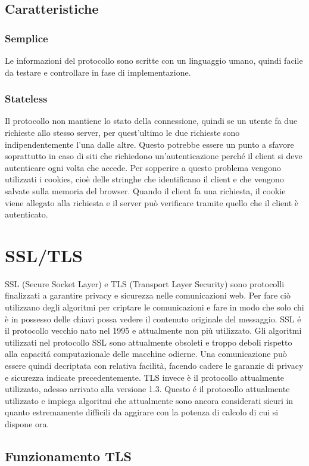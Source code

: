 \subsection{Caratteristiche}
\subsubsection{Semplice}
Le informazioni del protocollo sono scritte con un linguaggio umano, quindi facile da testare e controllare in fase di implementazione.
\subsubsection{Stateless}
Il protocollo non mantiene lo stato della connessione, quindi se un utente fa due richieste allo stesso server, per quest'ultimo le due richieste sono indipendentemente l'una dalle altre. Questo potrebbe essere un punto a sfavore soprattutto in caso di siti che richiedono un'autenticazione perché il client si deve autenticare ogni volta che accede. Per sopperire a questo problema vengono utilizzati i cookies, cioè delle stringhe che identificano il client e che vengono salvate sulla memoria del browser. Quando il client fa una richiesta, il cookie viene allegato alla richiesta e il server può verificare tramite quello che il client è autenticato.

\section{SSL/TLS}
\cite{tls}SSL (Secure Socket Layer) e TLS (Transport Layer Security) sono protocolli finalizzati a garantire privacy e sicurezza nelle comunicazioni web. Per fare ciò utilizzano degli algoritmi per criptare le comunicazioni e fare in modo che solo chi è in possesso delle chiavi possa vedere il contenuto originale del messaggio. SSL é il protocollo vecchio nato nel 1995 e attualmente non più utilizzato. Gli algoritmi utilizzati nel protocollo SSL sono attualmente obsoleti e troppo deboli rispetto alla capacitá computazionale delle macchine odierne. Una comunicazione può essere quindi decriptata con relativa facilità, facendo cadere le garanzie di privacy e sicurezza indicate precedentemente. TLS invece è il protocollo attualmente utilizzato, adesso arrivato alla versione 1.3. Questo é il protocollo attualmente utilizzato e impiega algoritmi che attualmente sono ancora considerati sicuri in quanto estremamente difficili da aggirare con la potenza di calcolo di cui si dispone ora.
\subsection{Funzionamento TLS}

